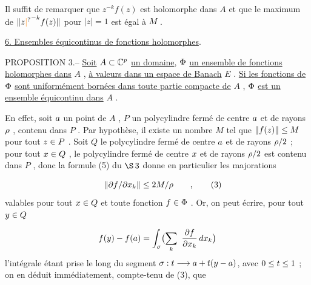 Il suffit de remarquer que $z^{-k}f(z)$ est holomorphe dans $A$ et que le maximum de $\|z\unsure{\vert}^{-k}f(z)\|$ pour $|z|=1$ est égal à $M$ .

\uline{6. Ensembles équicontinus de fonctions holomorphes}.

PROPOSITION 3.-- \uline{Soit} $A\subset\mathbb C^p$ \uline{un domaine}, $\Phi$ \uline{un ensemble de fonctions holomorphes dans} $A$ , \uline{à valeurs dans un espace de Banach} $E$ . \uline{Si les fonctions de} $\Phi$ \uline{sont uniformément bornées dans toute partie compacte de} $A$ , $\Phi$ \uline{est un ensemble équicontinu dans} $A$ .

En effet, soit $a$ un point de $A$ , $P$ un polycylindre fermé de centre $a$ et de rayons $\rho$ , contenu dans $P$ . Par hypothèse, il existe un nombre $M$ tel que $\|f(z)\|\leq M$ pour tout $z\in P$ . Soit $Q$ le polycylindre fermé de centre $a$ et de rayons $\rho/2$ ; pour tout $x\in Q$ , le polycylindre fermé de centre $x$ et de rayons $\rho/2$ est contenu dans $P$ , donc la formule (5) du $\S\,3$ donne en particulier les majorations

\[
\lVert\handwritten{\partial}f/\handwritten{\partial}x_k\rVert\handwritten{\leq}2M/\handwritten{\rho}\qquad ,\tag*{\makebox[0pt][r]{\makebox[\displaywidth][l]{(3)}}}
\]
valables pour tout $x\in Q$ et toute fonction $f\in\Phi$ . Or, on peut écrire, pour tout $y\in Q$

\[
f(\handwritten{y})-f(\handwritten{a})=\handwritten{\int_{\sigma}}\bigl(\handwritten{\sum_k}\ \frac{\handwritten{\partial} f}{\handwritten{\partial} x_k}\,dx_k\bigr)
\]
l'intégrale étant prise le long du segment $\sigma:t\longrightarrow a+t(y-a)$, avec $0\leq t\leq1$ ; on en déduit immédiatement, compte-tenu de (3), que

